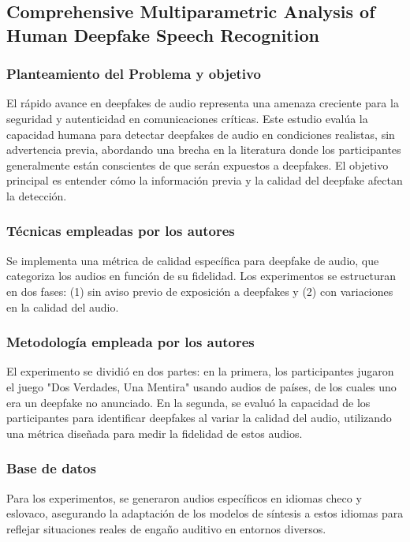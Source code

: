 \subsection{Comprehensive Multiparametric Analysis of Human Deepfake Speech Recognition \citep*{malinka2024comprehensive}}

\subsubsection{Planteamiento del Problema y objetivo }
El rápido avance en deepfakes de audio representa una amenaza creciente para la seguridad y autenticidad en comunicaciones críticas. Este estudio evalúa la capacidad humana para detectar deepfakes de audio en condiciones realistas, sin advertencia previa, abordando una brecha en la literatura donde los participantes generalmente están conscientes de que serán expuestos a deepfakes. El objetivo principal es entender cómo la información previa y la calidad del deepfake afectan la detección.

\subsubsection{Técnicas empleadas por los autores}
Se implementa una métrica de calidad específica para deepfake de audio, que categoriza los audios en función de su fidelidad. Los experimentos se estructuran en dos fases: (1) sin aviso previo de exposición a deepfakes y (2) con variaciones en la calidad del audio.

\subsubsection{Metodología empleada por los autores}
El experimento se dividió en dos partes: en la primera, los participantes jugaron el juego "Dos Verdades, Una Mentira" usando audios de países, de los cuales uno era un deepfake no anunciado. En la segunda, se evaluó la capacidad de los participantes para identificar deepfakes al variar la calidad del audio, utilizando una métrica diseñada para medir la fidelidad de estos audios.

\subsubsection{Base de datos}
Para los experimentos, se generaron audios específicos en idiomas checo y eslovaco, asegurando la adaptación de los modelos de síntesis a estos idiomas para reflejar situaciones reales de engaño auditivo en entornos diversos.


